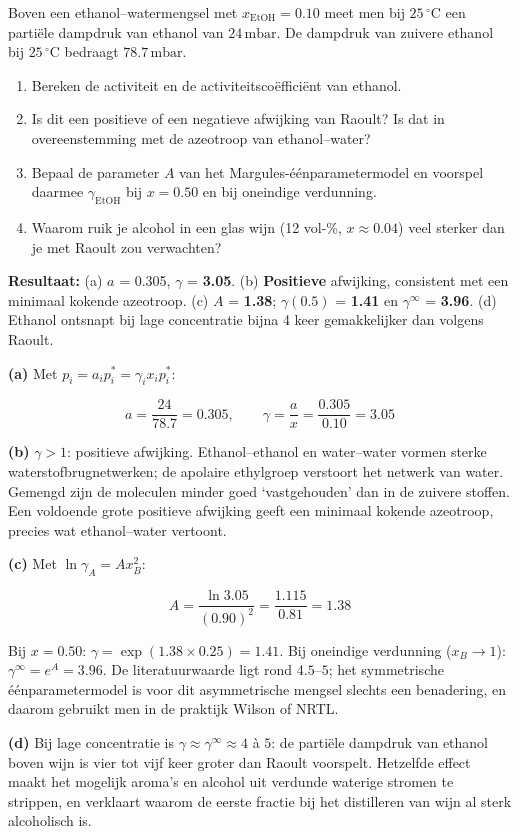 \begin{oefening}
Boven een ethanol--watermengsel met \(x_{\text{EtOH}} = 0.10\) meet men bij \(25\,^\circ\mathrm{C}\) een partiële dampdruk van ethanol van \(24\,\mathrm{mbar}\). De dampdruk van zuivere ethanol bij \(25\,^\circ\mathrm{C}\) bedraagt \(78.7\,\mathrm{mbar}\).

\begin{enumerate}
\item[(a)]
  Bereken de activiteit en de activiteitscoëfficiënt van ethanol.
\item[(b)]
  Is dit een positieve of een negatieve afwijking van Raoult? Is dat in overeenstemming met de azeotroop van ethanol--water?
\item[(c)]
  Bepaal de parameter \(A\) van het Margules-éénparametermodel en voorspel daarmee \(\gamma_{\text{EtOH}}\) bij \(x = 0.50\) en bij oneindige verdunning.
\item[(d)]
  Waarom ruik je alcohol in een glas wijn (12 vol-\%, \(x \approx 0.04\)) veel sterker dan je met Raoult zou verwachten?
\end{enumerate}
\end{oefening}
\begin{oplossing}
\textbf{Resultaat:} (a) \(a\) = 0.305, \(\gamma\) = \textbf{3.05}. (b) \textbf{Positieve} afwijking, consistent met een minimaal kokende azeotroop. (c) \(A\) = \textbf{1.38}; \(\gamma(0.5)\) = \textbf{1.41} en \(\gamma^\infty\) = \textbf{3.96}. (d) Ethanol ontsnapt bij lage concentratie bijna 4 keer gemakkelijker dan volgens Raoult.

\textbf{(a)} Met \(p_i = a_i p_i^* = \gamma_i x_i p_i^*\):

\[
a = \frac{24}{78.7} = 0.305, \qquad \gamma = \frac{a}{x} = \frac{0.305}{0.10} = 3.05
\]

\textbf{(b)} \(\gamma > 1\): positieve afwijking. Ethanol--ethanol en water--water vormen sterke waterstofbrugnetwerken; de apolaire ethylgroep verstoort het netwerk van water. Gemengd zijn de moleculen minder goed `vastgehouden' dan in de zuivere stoffen. Een voldoende grote positieve afwijking geeft een minimaal kokende azeotroop, precies wat ethanol--water vertoont.

\textbf{(c)} Met \(\ln \gamma_A = A x_B^2\):

\[
A = \frac{\ln 3.05}{(0.90)^2} = \frac{1.115}{0.81} = 1.38
\]

Bij \(x = 0.50\): \(\gamma = \exp(1.38 \times 0.25) = 1.41\). Bij oneindige verdunning (\(x_B \to 1\)): \(\gamma^\infty = e^{A} = 3.96\). De literatuurwaarde ligt rond \(4.5\)--\(5\); het symmetrische éénparametermodel is voor dit asymmetrische mengsel slechts een benadering, en daarom gebruikt men in de praktijk Wilson of NRTL.

\textbf{(d)} Bij lage concentratie is \(\gamma \approx \gamma^\infty \approx 4\) à \(5\): de partiële dampdruk van ethanol boven wijn is vier tot vijf keer groter dan Raoult voorspelt. Hetzelfde effect maakt het mogelijk aroma's en alcohol uit verdunde waterige stromen te strippen, en verklaart waarom de eerste fractie bij het distilleren van wijn al sterk alcoholisch is.
\end{oplossing}

